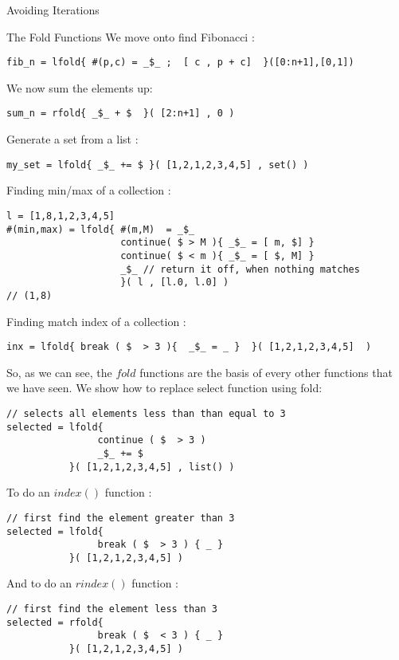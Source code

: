 \begin{section}{Avoiding Iterations}
\begin{subsection}{The Fold Functions}
We move onto find Fibonacci : 

\begin{lstlisting}[style=JexlStyle]
fib_n = lfold{ #(p,c) = _$_ ;  [ c , p + c]  }([0:n+1],[0,1])
\end{lstlisting}

We now sum the elements up: 

\begin{lstlisting}[style=JexlStyle]
sum_n = rfold{ _$_ + $  }( [2:n+1] , 0 )
\end{lstlisting}

Generate a set from a list : 

\begin{lstlisting}[style=JexlStyle]
my_set = lfold{ _$_ += $ }( [1,2,1,2,3,4,5] , set() )
\end{lstlisting}

Finding min/max of a collection : 

\begin{lstlisting}[style=JexlStyle]
l = [1,8,1,2,3,4,5] 
#(min,max) = lfold{ #(m,M)  = _$_ 
                    continue( $ > M ){ _$_ = [ m, $] }   
                    continue( $ < m ){ _$_ = [ $, M] } 
                    _$_ // return it off, when nothing matches   
                    }( l , [l.0, l.0] )
// (1,8)                    
\end{lstlisting}

Finding match index of a collection : 

\begin{lstlisting}[style=JexlStyle]
inx = lfold{ break ( $  > 3 ){  _$_ = _ }  }( [1,2,1,2,3,4,5]  )
\end{lstlisting}

So, as we can see, the $fold$ functions are the basis of every other functions
that we have seen. We show how to replace select function using fold: 
\begin{lstlisting}[style=JexlStyle]
// selects all elements less than than equal to 3
selected = lfold{ 
                continue ( $  > 3 )  
                _$_ += $   
           }( [1,2,1,2,3,4,5] , list() )
\end{lstlisting}

To do an $index()$ function : 

\begin{lstlisting}[style=JexlStyle]
// first find the element greater than 3
selected = lfold{ 
                break ( $  > 3 ) { _ }   
           }( [1,2,1,2,3,4,5] )
\end{lstlisting}

And to do an $rindex()$ function : 

\begin{lstlisting}[style=JexlStyle]
// first find the element less than 3
selected = rfold{ 
                break ( $  < 3 ) { _ }   
           }( [1,2,1,2,3,4,5] )
\end{lstlisting}

\end{subsection}
\end{section}
